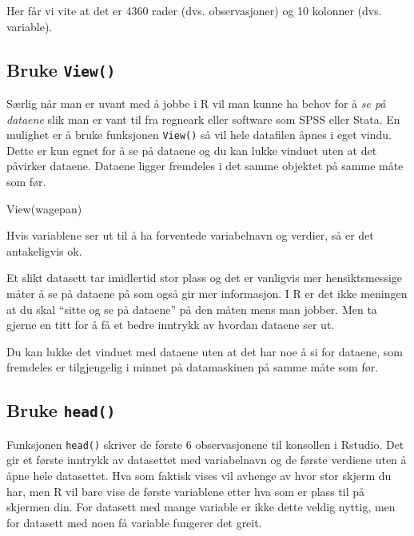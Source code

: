 \documentclass[
  norsk,
  letterpaper,
  DIV=11,
  numbers=noendperiod]{scrreprt}
\newenvironment{Shaded}{\begin{snugshade}}{\end{snugshade}}
\newcommand{\FunctionTok}[1]{\textcolor[rgb]{0.28,0.35,0.67}{#1}}
\newcommand{\NormalTok}[1]{\textcolor[rgb]{0.00,0.23,0.31}{#1}}
\theoremstyle{definition}
\theoremstyle{remark}
\begin{document}
Her får vi vite at det er 4360 rader (dvs. observasjoner) og 10 kolonner
(dvs. variable).

\subsection{\texorpdfstring{Bruke
\texttt{View()}}{Bruke View()}}\label{bruke-view}

Særlig når man er uvant med å jobbe i R vil man kunne ha behov for å
\emph{se på dataene} slik man er vant til fra regneark eller software
som SPSS eller Stata. En mulighet er å bruke funksjonen \texttt{View()}
så vil hele datafilen åpnes i eget vindu. Dette er kun egnet for å se på
dataene og du kan lukke vinduet uten at det påvirker dataene. Dataene
ligger fremdeles i det samme objektet på samme måte som før.

\begin{Shaded}
\begin{Highlighting}[]
\FunctionTok{View}\NormalTok{(wagepan)}
\end{Highlighting}
\end{Shaded}

Hvis variablene ser ut til å ha forventede variabelnavn og verdier, så
er det antakeligvis ok.

Et slikt datasett tar imidlertid stor plass og det er vanligvis mer
hensiktsmessige måter å se på dataene på som også gir mer informasjon. I
R er det ikke meningen at du skal ``sitte og se på dataene'' på den
måten mens man jobber. Men ta gjerne en titt for å få et bedre inntrykk
av hvordan dataene ser ut.

Du kan lukke det vinduet med dataene uten at det har noe å si for
dataene, som fremdeles er tilgjengelig i minnet på datamaskinen på samme
måte som før.

\subsection{\texorpdfstring{Bruke
\texttt{head()}}{Bruke head()}}\label{bruke-head}

Funksjonen \texttt{head()} skriver de første 6 observasjonene til
konsollen i Rstudio. Det gir et første inntrykk av datasettet med
variabelnavn og de første verdiene uten å åpne hele datasettet. Hva som
faktisk vises vil avhenge av hvor stor skjerm du har, men R vil bare
vise de første variablene etter hva som er plass til på skjermen din.
For datasett med mange variable er ikke dette veldig nyttig, men for
datasett med noen få variable fungerer det greit.
\end{document}
